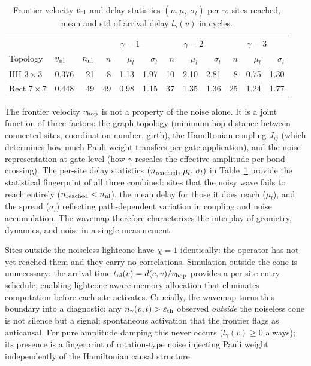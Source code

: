 \documentclass[letterpaper]{article}
\begin{document}
\begin{table}[t]
\centering
\setlength{\tabcolsep}{2pt}
\scriptsize
\begin{tabular}{llr rrr rrr rrr}
\toprule
 & & & \multicolumn{3}{c}{$\gamma=1$} & \multicolumn{3}{c}{$\gamma=2$} & \multicolumn{3}{c}{$\gamma=3$} \\
Topology & $v_{\rm nl}$ & $n_{\rm nl}$ & $n$ & $\mu_l$ & $\sigma_l$ & $n$ & $\mu_l$ & $\sigma_l$ & $n$ & $\mu_l$ & $\sigma_l$ \\
\midrule
HH $3\times3$ & 0.376 & 21 & 8 & 1.13 & 1.97 & 10 & 2.10 & 2.81 & 8 & 0.75 & 1.30 \\
Rect $7\times7$ & 0.448 & 49 & 49 & 0.98 & 1.15 & 37 & 1.35 & 1.36 & 25 & 1.24 & 1.77 \\
\bottomrule
\end{tabular}
\caption{Frontier velocity $v_{\rm nl}$ and delay statistics
$(n,\mu_l,\sigma_l)$ per $\gamma$: sites reached, mean and std of
arrival delay $l_\gamma(v)$ in cycles.}
\label{tab:vhop}
\end{table}

The frontier velocity $v_{\rm hop}$ is not a property of the noise alone.
It is a joint function of three factors: the graph topology (minimum hop
distance between connected sites, coordination number, girth), the
Hamiltonian coupling $J_{ij}$ (which determines how much Pauli weight
transfers per gate application), and the noise representation at gate
level (how $\gamma$ rescales the effective amplitude per bond crossing).
The per-site delay statistics $(n_{\rm reached},\,\mu_l,\,\sigma_l)$
in Table~\ref{tab:vhop} provide the statistical fingerprint of all
three combined: sites that the noisy wave fails to reach entirely
($n_{\rm reached} < n_{\rm nl}$), the mean delay for those it does
reach ($\mu_l$), and the spread ($\sigma_l$) reflecting path-dependent
variation in coupling and noise accumulation.
The wavemap therefore characterizes the interplay of geometry, dynamics,
and noise in a single measurement.

Sites outside the noiseless lightcone have $\chi=1$ identically: the
operator has not yet reached them and they carry no correlations.
Simulation outside the cone is unnecessary: the arrival time
$t_{\rm nl}(v) = d(c,v)/v_{\rm hop}$ provides a per-site entry
schedule, enabling lightcone-aware memory allocation that eliminates
computation before each site activates.
Crucially, the wavemap turns this boundary into a diagnostic: any
$n_\gamma(v,t) > \varepsilon_{\rm th}$ observed \emph{outside} the
noiseless cone is not silence but a signal: spontaneous activation
that the frontier flags as anticausal.
For pure amplitude damping this never occurs ($l_\gamma(v) \geq 0$
always); its presence is a fingerprint of rotation-type noise injecting
Pauli weight independently of the Hamiltonian causal structure.
\end{document}
